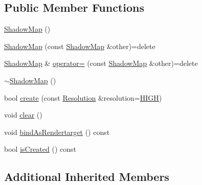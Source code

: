 \subsection*{Public Member Functions}
\begin{DoxyCompactItemize}
\item 
\hyperlink{classburn_1_1_shadow_map_a86f8dc0f4c9000f5d8598ab6519e8de4}{Shadow\-Map} ()
\item 
\hyperlink{classburn_1_1_shadow_map_a167c53e4c4b82b664994d2505d1a3a11}{Shadow\-Map} (const \hyperlink{classburn_1_1_shadow_map}{Shadow\-Map} \&other)=delete
\item 
\hyperlink{classburn_1_1_shadow_map}{Shadow\-Map} \& \hyperlink{classburn_1_1_shadow_map_aac229703746b53fbf8099871b291a4ef}{operator=} (const \hyperlink{classburn_1_1_shadow_map}{Shadow\-Map} \&other)=delete
\item 
\hyperlink{classburn_1_1_shadow_map_a853fac8f91d057da02ce65ac2c5a5a7f}{$\sim$\-Shadow\-Map} ()
\item 
bool \hyperlink{classburn_1_1_shadow_map_ae1fff318e3b188b925f2bd898337fcad}{create} (const \hyperlink{classburn_1_1_shadow_map_a5bc770d75b5d4d1c8f755546d20266d1}{Resolution} \&resolution=\hyperlink{classburn_1_1_shadow_map_a5bc770d75b5d4d1c8f755546d20266d1a0f4c9ac68ca6faffa3ca9d7adeea6093}{H\-I\-G\-H})
\item 
void \hyperlink{classburn_1_1_shadow_map_a791a5b8c53c3e1d1e88cf8252d81af50}{clear} ()
\item 
void \hyperlink{classburn_1_1_shadow_map_ab8d3115d83d69d7eb4d358760f9ca43d}{bind\-As\-Rendertarget} () const 
\item 
bool \hyperlink{classburn_1_1_shadow_map_a06b9cd9e57cc3e5914c4d20d56f0655b}{is\-Created} () const 
\end{DoxyCompactItemize}
\subsection*{Additional Inherited Members}


